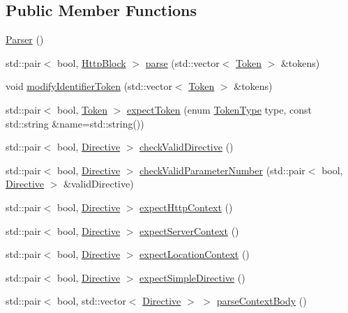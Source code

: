 \subsection*{Public Member Functions}
\begin{DoxyCompactItemize}
\item 
\hyperlink{classft_1_1_parser_a6bfb42ee628e026bebda9adb7ae8b895}{Parser} ()
\item 
std\+::pair$<$ bool, \hyperlink{classft_1_1_http_block}{Http\+Block} $>$ \hyperlink{classft_1_1_parser_ace9c91f641d6eb5467ce89798679b248}{parse} (std\+::vector$<$ \hyperlink{classft_1_1_token}{Token} $>$ \&tokens)
\item 
void \hyperlink{classft_1_1_parser_a8226e5286bd1e9354998fe9e6bb63d08}{modify\+Identifier\+Token} (std\+::vector$<$ \hyperlink{classft_1_1_token}{Token} $>$ \&tokens)
\item 
std\+::pair$<$ bool, \hyperlink{classft_1_1_token}{Token} $>$ \hyperlink{classft_1_1_parser_a1615a752d3642bb53598e2c8db810db0}{expect\+Token} (enum \hyperlink{namespaceft_aa520fbf142ba1e7e659590c07da31921}{Token\+Type} type, const std\+::string \&name=std\+::string())
\item 
std\+::pair$<$ bool, \hyperlink{classft_1_1_directive}{Directive} $>$ \hyperlink{classft_1_1_parser_ad48298d21629daf7c9a31e101bf322ba}{check\+Valid\+Directive} ()
\item 
std\+::pair$<$ bool, \hyperlink{classft_1_1_directive}{Directive} $>$ \hyperlink{classft_1_1_parser_a31501116433b0b1f8d9d58f27658ea98}{check\+Valid\+Parameter\+Number} (std\+::pair$<$ bool, \hyperlink{classft_1_1_directive}{Directive} $>$ \&valid\+Directive)
\item 
std\+::pair$<$ bool, \hyperlink{classft_1_1_directive}{Directive} $>$ \hyperlink{classft_1_1_parser_abcf864a160e3c4e1866edceae06b921b}{expect\+Http\+Context} ()
\item 
std\+::pair$<$ bool, \hyperlink{classft_1_1_directive}{Directive} $>$ \hyperlink{classft_1_1_parser_a72f108d920a35284bf8f740bb8240acd}{expect\+Server\+Context} ()
\item 
std\+::pair$<$ bool, \hyperlink{classft_1_1_directive}{Directive} $>$ \hyperlink{classft_1_1_parser_a002b236022851df6ef2203aab9b24a73}{expect\+Location\+Context} ()
\item 
std\+::pair$<$ bool, \hyperlink{classft_1_1_directive}{Directive} $>$ \hyperlink{classft_1_1_parser_a81d18b750d54e1e3002070531045171b}{expect\+Simple\+Directive} ()
\item 
std\+::pair$<$ bool, std\+::vector$<$ \hyperlink{classft_1_1_directive}{Directive} $>$ $>$ \hyperlink{classft_1_1_parser_aa8d68b83134b46e4b9115d9acd0cbf57}{parse\+Context\+Body} ()

\end{DoxyCompactItemize}
